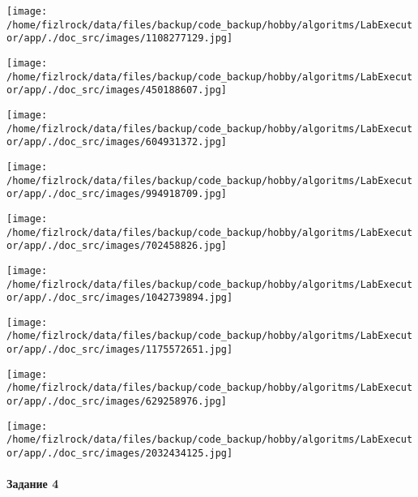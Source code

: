 \documentclass[a4paper, 12pt]{article}
\begin{document}
\texttt{[image: /home/fizlrock/data/files/backup/code\_backup/hobby/algoritms/LabExecutor/app/./doc\_src/images/1108277129.jpg]}

\texttt{[image: /home/fizlrock/data/files/backup/code\_backup/hobby/algoritms/LabExecutor/app/./doc\_src/images/450188607.jpg]}

\texttt{[image: /home/fizlrock/data/files/backup/code\_backup/hobby/algoritms/LabExecutor/app/./doc\_src/images/604931372.jpg]}

\texttt{[image: /home/fizlrock/data/files/backup/code\_backup/hobby/algoritms/LabExecutor/app/./doc\_src/images/994918709.jpg]}

\texttt{[image: /home/fizlrock/data/files/backup/code\_backup/hobby/algoritms/LabExecutor/app/./doc\_src/images/702458826.jpg]}

\texttt{[image: /home/fizlrock/data/files/backup/code\_backup/hobby/algoritms/LabExecutor/app/./doc\_src/images/1042739894.jpg]}

\texttt{[image: /home/fizlrock/data/files/backup/code\_backup/hobby/algoritms/LabExecutor/app/./doc\_src/images/1175572651.jpg]}

\texttt{[image: /home/fizlrock/data/files/backup/code\_backup/hobby/algoritms/LabExecutor/app/./doc\_src/images/629258976.jpg]}

\texttt{[image: /home/fizlrock/data/files/backup/code\_backup/hobby/algoritms/LabExecutor/app/./doc\_src/images/2032434125.jpg]}
\pagebreak
\paragraph{Задание 4}
\end{document}
